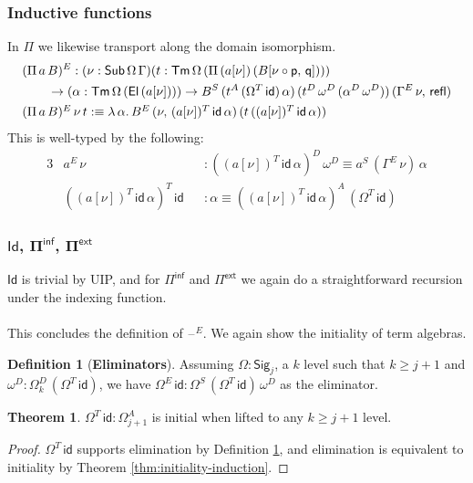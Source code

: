 \documentclass[12pt,a4paper,twoside,openany]{book}
\theoremstyle{remark}
\theoremstyle{definition}
\newtheorem{mydefinition}{Definition}
\theoremstyle{theorem}
\newtheorem{theorem}{Theorem}
\newcommand{\bs}[1]{\boldsymbol{#1}}
\newcommand{\refl}{\mathsf{refl}}
\newcommand{\id}{\mathsf{id}}
\newcommand{\Sub}{\mathsf{Sub}}
\newcommand{\Tm}{\mathsf{Tm}}
\newcommand{\El}{\mathsf{El}}
\newcommand{\Id}{\mathsf{Id}}
\newcommand{\blank}{\mathord{\hspace{1pt}\text{--}\hspace{1pt}}}
\newcommand{\Pie}{\Pi^{\mathsf{ext}}}
\newcommand{\Piinf}{\Pi^{\mathsf{inf}}}
\newcommand{\Sig}{\mathsf{Sig}}
\newcommand{\p}{\mathsf{p}}
\newcommand{\q}{\mathsf{q}}
\newcommand{\defn}{:\equiv}
\begin{document}
\subsubsection{Inductive functions}
In $\Pi$ we likewise transport along the domain isomorphism.
\begin{alignat*}{3}
 &(\Pi\,a\,B)^E : (\nu : \Sub\,\Omega\,\Gamma)(t : \Tm\,\Omega\,(\Pi\,(a[\nu])\,(B[\nu\circ\p,\,\q])))\\
 & \hspace{2em}\to (\alpha : \Tm\,\Omega\,(\El\,(a[\nu]))) \to B^S\,(t^A\,(\Omega^T\,\id)\,\alpha)\,(t^D\,\omega^D\,(\alpha^D\,\omega^D))\,(\Gamma^E\,\nu,\,\refl)\\
 &\rlap{$(\Pi\,a\,B)^E\,\nu\,t \defn \lambda\,\alpha.\,B^E\,(\nu,\,(a[\nu])^T\,\id\,\alpha)\,(t\,((a[\nu])^T\,\id\,\alpha))$}
\end{alignat*}
This is well-typed by the following:
\begin{alignat*}{3}
  & a^E\,\nu &&: ((a[\nu])^T\,\id\,\alpha)^D\,\omega^D \equiv a^S\,(\Gamma^E\,\nu)\,\alpha\\
  & ((a[\nu])^T\,\id\,\alpha)^T\,\id &&: \alpha \equiv ((a[\nu])^T\,\id\,\alpha)^A\,(\Omega^T\,\id)
\end{alignat*}

\subsubsection{$\bs{\Id}$, $\bs{\Piinf}$, $\bs{\Pie}$}

$\Id$ is trivial by UIP, and for $\Piinf$ and $\Pie$ we again do a straightforward recursion
under the indexing function.
\\\\
This concludes the definition of $\blank^E$. We again show the initiality of term algebras.

\begin{mydefinition}[\textbf{Eliminators}]
\label{def:iqiit-eliminator}
Assuming $\Omega : \Sig_j$, a $k$ level such that $k \geq j + 1$ and $\omega^D :
\Omega^D_{k}\,(\Omega^T\,\id)$, we have $\Omega^E\,\id : \Omega^S\,(\Omega^T\,\id)\,\omega^D$ as
the eliminator.
\end{mydefinition}

\begin{theorem}
  $\Omega^T\,\id : \Omega^A_{j+1}$ is initial when lifted to any $k \geq j + 1$ level.
\end{theorem}
\begin{proof}
  $\Omega^T\,\id$ supports elimination by Definition
  \ref{def:iqiit-eliminator}, and elimination is equivalent to initiality by
  Theorem \ref{thm:initiality-induction}.
\end{proof}
\end{document}
